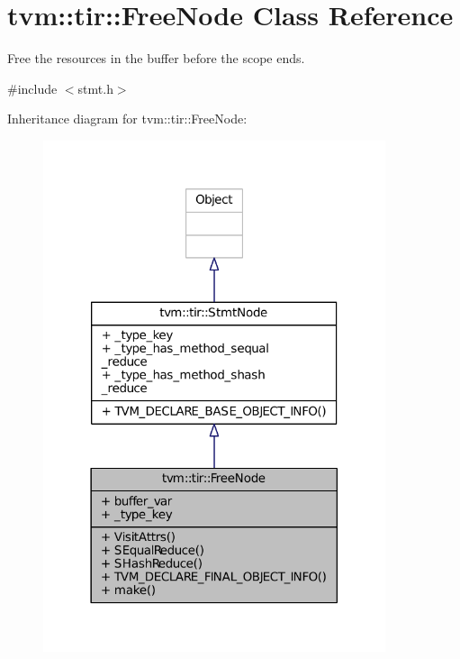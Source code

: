 \hypertarget{classtvm_1_1tir_1_1FreeNode}{}\section{tvm\+:\+:tir\+:\+:Free\+Node Class Reference}
\label{classtvm_1_1tir_1_1FreeNode}


Free the resources in the buffer before the scope ends.  




{\ttfamily \#include $<$stmt.\+h$>$}



Inheritance diagram for tvm\+:\+:tir\+:\+:Free\+Node\+:
\nopagebreak
\begin{figure}[H]
\begin{center}
\leavevmode
\includegraphics[width=285pt]{classtvm_1_1tir_1_1FreeNode__inherit__graph}
\end{center}
\end{figure}


